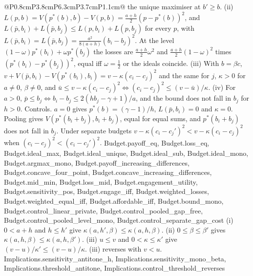 \begin{longtable}{@{}P{0.8cm}P{3.8cm}P{6.3cm}P{3.7cm}P{1.1cm}@{}}
{  the unique maximiser at $b'\ge b$.
  (ii) $L(p,b)=V(p^*(b),b)-V(p,b)=\tfrac{a+h}{2}(p-p^*(b))^2$, and
  $L(\bar p,b_i)+L(\bar p,b_j)\le L(p,b_i)+L(p,b_j)$ for every $p$, with
  $L(\bar p,b_i)=L(\bar p,b_j)=\tfrac{a^2}{8(a+h)}(b_i-b_j)^2$. At the level
  $(1-\omega)p^*(b_i)+\omega p^*(b_j)$ the losses are
  $\tfrac{a+h}{2}\omega^2$ and $\tfrac{a+h}{2}(1-\omega)^2$ times
  $(p^*(b_i)-p^*(b_j))^2$, equal iff $\omega=\tfrac12$ or the ideals
  coincide.
  (iii) With $b=\beta c$, $v+V(\bar p,b_i)-V(p^*(b_i),b_i)=v-\kappa(c_i-c_j)^2$
  and the same for $j$, $\kappa>0$ for $a\ne0$, $\beta\ne0$, and
  $\bar u\le v-\kappa(c_i-c_j)^2\iff(c_i-c_j)^2\le(v-\bar u)/\kappa$.
  (iv) For $a>0$, $\bar p\le b_j\iff b_i-b_j\le2(hb_j-\gamma+1)/a$, and the
  bound does not fall in $b_j$ for $h>0$.
  Controls. $a=0$ gives $p^*(b)=(\gamma-1)/h$, $L(\bar p,b_i)=0$ and
  $\kappa=0$. Pooling gives $V(p^*(b_i+b_j),b_i+b_j)$, equal for equal sums,
  and $p^*(b_i+b_j)$ does not fall in $b_j$. Under separate budgets
  $v-\kappa(c_i-c_j')^2<v-\kappa(c_i-c_j)^2$ when $(c_i-c_j)^2<(c_i-c_j')^2$.}
  {Budget.payoff_eq, Budget.loss_eq, Budget.ideal_max, Budget.ideal_unique, Budget.ideal_sub, Budget.ideal_mono, Budget.argmax_mono, Budget.payoff_increasing_differences, Budget.concave_four_point, Budget.concave_increasing_differences, Budget.mid_min, Budget.loss_mid, Budget.engagement_utility, Budget.sensitivity_pos, Budget.engage_iff, Budget.weighted_losses, Budget.weighted_equal_iff, Budget.affordable_iff, Budget.bound_mono, Budget.control_linear_private, Budget.control_pooled_gap_free, Budget.control_pooled_level_mono, Budget.control_separate_gap_cost}
  {(i) $0<a+h$ and $h\le h'$ give $\kappa(a,h',\beta)\le\kappa(a,h,\beta)$.
  (ii) $0\le\beta\le\beta'$ gives $\kappa(a,h,\beta)\le\kappa(a,h,\beta')$.
  (iii) $u\le v$ and $0<\kappa\le\kappa'$ give $(v-u)/\kappa'\le(v-u)/\kappa$.
  (iii) reverses with $v<u$.}
  {Implications.sensitivity_antitone_h, Implications.sensitivity_mono_beta, Implications.threshold_antitone, Implications.control_threshold_reverses}
\end{longtable}
